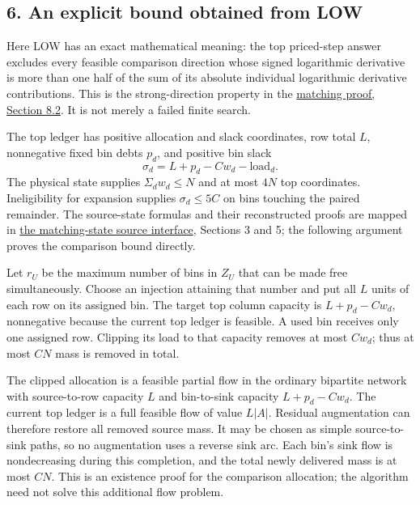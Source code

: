 \hypertarget{af-f687f276ee-an-explicit-bound-obtained-from-low}{%
\subsection{6. An explicit bound obtained from LOW}\label{af-f687f276ee-an-explicit-bound-obtained-from-low}}

Here LOW has an exact mathematical meaning: the top priced-step answer excludes every feasible comparison direction whose signed logarithmic derivative is more than one half of the sum of its absolute individual logarithmic derivative contributions. This is the strong-direction property in the \href{https://github.com/icekylinx/algorithm-frontier/blob/main/problems/general-matching/proof.md}{matching proof, Section 8.2}. It is not merely a failed finite search.

The top ledger has positive allocation and slack coordinates, row total \(L\), nonnegative fixed bin debts \(p_d\), and positive bin slack \[
\sigma_d=L+p_d-Cw_d-\mathrm{load}_d.
\] The physical state supplies \(Σ_d w_d≤N\) and at most \(4N\) top coordinates. Ineligibility for expansion supplies \(σ_d≤5C\) on bins touching the paired remainder. The source-state formulas and their reconstructed proofs are mapped in \href{https://github.com/icekylinx/algorithm-frontier/blob/main/manuscripts/graph-backends/oai-baseline-and-imports.md}{the matching-state source interface}, Sections 3 and 5; the following argument proves the comparison bound directly.

Let \(r_U\) be the maximum number of bins in \(Z_U\) that can be made free simultaneously. Choose an injection attaining that number and put all \(L\) units of each row on its assigned bin. The target top column capacity is \(L+p_d-Cw_d\), nonnegative because the current top ledger is feasible. A used bin receives only one assigned row. Clipping its load to that capacity removes at most \(Cw_d\); thus at most \(CN\) mass is removed in total.

The clipped allocation is a feasible partial flow in the ordinary bipartite network with source-to-row capacity \(L\) and bin-to-sink capacity \(L+p_d-Cw_d\). The current top ledger is a full feasible flow of value \(L|A|\). Residual augmentation can therefore restore all removed source mass. It may be chosen as simple source-to-sink paths, so no augmentation uses a reverse sink arc. Each bin's sink flow is nondecreasing during this completion, and the total newly delivered mass is at most \(CN\). This is an existence proof for the comparison allocation; the algorithm need not solve this additional flow problem.

